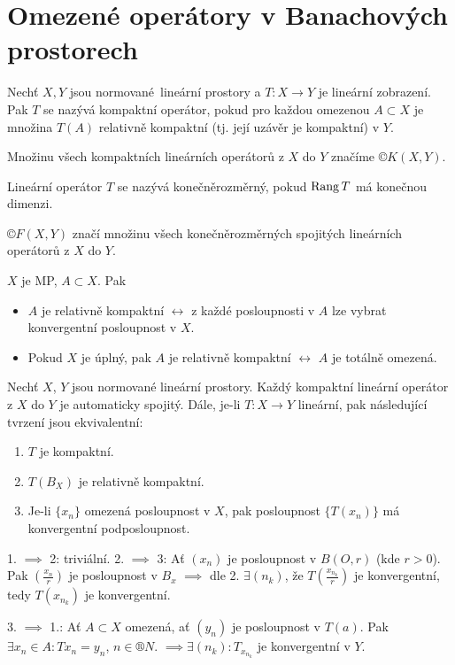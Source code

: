 \documentclass[12pt]{article}					%
\begin{document}
\section{Omezené operátory v Banachových prostorech}
\begin{definice}
	Nechť $X, Y$ jsou normované lineární prostory a $T: X \rightarrow Y$ je lineární zobrazení. Pak $T$ se nazývá kompaktní operátor, pokud pro každou omezenou $A \subset X$ je množina $T(A)$ relativně kompaktní (tj. její uzávěr je kompaktní) v $Y$.

	Množinu všech kompaktních lineárních operátorů z $X$ do $Y$ značíme $©K(X, Y)$.

	Lineární operátor $T$ se nazývá konečněrozměrný, pokud $\operatorname{Rang} T$ má konečnou dimenzi.

	$©F(X, Y)$ značí množinu všech konečněrozměrných spojitých lineárních operátorů z $X$ do $Y$.
\end{definice}

\begin{poznamka}
	$X$ je MP, $A \subset X$. Pak

	\begin{itemize}
		\item $A$ je relativně kompaktní $\leftrightarrow$ z každé posloupnosti v $A$ lze vybrat konvergentní posloupnost v $X$.
		\item Pokud $X$ je úplný, pak $A$ je relativně kompaktní $\leftrightarrow$ $A$ je totálně omezená.
	\end{itemize}
\end{poznamka}

\begin{tvrzeni}
	Nechť $X$, $Y$ jsou normované lineární prostory. Každý kompaktní lineární operátor z $X$ do $Y$ je automaticky spojitý. Dále, je-li $T: X \rightarrow Y$ lineární, pak následující tvrzení jsou ekvivalentní:

	\begin{enumerate}
		\item $T$ je kompaktní.
		\item $T(B_X)$ je relativně kompaktní.
		\item Je-li $\{x_n\}$ omezená posloupnost v $X$, pak posloupnost $\{T(x_n)\}$ má konvergentní podposloupnost.
	\end{enumerate}

	\begin{dukazin}
		1. $\implies$ 2: triviální. 2. $\implies$ 3: Ať $(x_n)$ je posloupnost v $B(O, r)$ (kde $r > 0$). Pak $(\frac{x_n}{r})$ je posloupnost v $B_x$ $\implies$ dle 2. $\exists (n_k)$, že $T(\frac{x_{n_k}}{r})$ je konvergentní, tedy $T(x_{n_k})$ je konvergentní.

		3. $\implies$ 1.: Ať $A \subset X$ omezená, ať $(y_n)$ je posloupnost v $T(a)$. Pak $\exists x_n \in A: T x_n = y_n$, $n \in ®N$. $\implies \exists (n_k): T_{x_{n_k}}$ je konvergentní v $Y$.
	\end{dukazin}
\end{tvrzeni}
\end{document}
